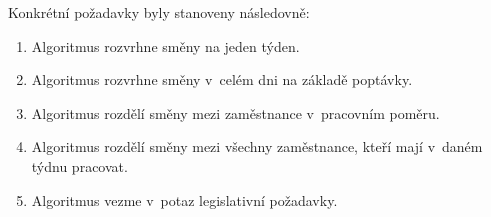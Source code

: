 \documentclass[twoside]{ctuthesis}
\begin{document}
Konkrétní požadavky byly stanoveny následovně:
\begin{enumerate}
	\item Algoritmus rozvrhne směny na jeden týden.
	\item Algoritmus rozvrhne směny v~celém dni na základě poptávky.
	\item Algoritmus rozdělí směny mezi zaměstnance v~pracovním poměru.
	\item Algoritmus rozdělí směny mezi všechny zaměstnance, kteří mají v~daném týdnu pracovat.
	\item Algoritmus vezme v~potaz legislativní požadavky.
\end{enumerate}

%
% 	
%
\end{document}
